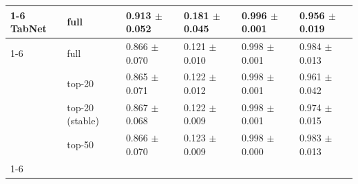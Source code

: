 \begin{tabular}{llllll}
\cline{1-6}
TabNet & full & 0.913 $\pm$ 0.052 & 0.181 $\pm$ 0.045 & 0.996 $\pm$ 0.001 & 0.956 $\pm$ 0.019 \\
\cline{1-6}
\multirow[t]{4}{*}{XGBoost} & full & 0.866 $\pm$ 0.070 & 0.121 $\pm$ 0.010 & 0.998 $\pm$ 0.001 & 0.984 $\pm$ 0.013 \\
 & top-20 & 0.865 $\pm$ 0.071 & 0.122 $\pm$ 0.012 & 0.998 $\pm$ 0.001 & 0.961 $\pm$ 0.042 \\
 & top-20 (stable) & 0.867 $\pm$ 0.068 & 0.122 $\pm$ 0.009 & 0.998 $\pm$ 0.001 & 0.974 $\pm$ 0.015 \\
 & top-50 & 0.866 $\pm$ 0.070 & 0.123 $\pm$ 0.009 & 0.998 $\pm$ 0.000 & 0.983 $\pm$ 0.013 \\
\cline{1-6}
\bottomrule
\end{tabular}
